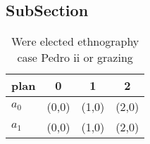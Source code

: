 \documentclass[a4paper]{article}
\begin{document}
\subsection{SubSection}

\begin{table}
\begin{adjustbox}{width=0.6\columnwidth}
\begin{tabular}{|l|l|l|l|}
\hline
\textbf{plan} & \multicolumn{1}{c|}{\textbf{0}} & \multicolumn{1}{c|}{\textbf{1}} & \multicolumn{1}{c|}{\textbf{2}} \\ \hline
\textbf{$a_0$}  & (0,0) & (1,0) & (2,0) \\ \hline
\textbf{$a_1$}  & (0,0) & (1,0) & (2,0) \\ \hline
\end{tabular}
\end{adjustbox}
\caption{Were elected ethnography case Pedro ii or grazing
}
\end{table}
\end{document}
